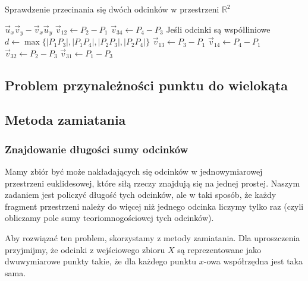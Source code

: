 \begin{algorithm}[H]
	\caption{Sprawdzenie przecinania się dwóch odcinków w przestrzeni $\mathbb{R}^2$}
	\begin{algorithmic}[1]
		\State \Return $\vec{u}_x \vec{v}_y - \vec{v}_x \vec{u}_y$
		\EndProcedure
		\State \Return \true
		\EndIf
		\State $\vec{v}_{12} \gets P_2 - P_1$
		\State $\vec{v}_{34} \gets P_4 - P_3$
		 \Comment Jeśli odcinki są współliniowe
		\State $d \gets \max\{|P_1P_3|, |P_1P_4|, |P_2P_3|, |P_2P_4|\}$
		\State \Return \true
		\EndIf
		\EndIf
		\State $\vec{v}_{13} \gets P_3 - P_1$
		\State $\vec{v}_{14} \gets P_4 - P_1$
		\State \Return \false
		\EndIf
		\State $\vec{v}_{32} \gets P_2 - P_3$
		\State $\vec{v}_{31} \gets P_1 - P_3$
		\State \Return \false
		\EndIf
		\State \Return \true
		\EndProcedure
	\end{algorithmic}
	\label{segment_intersection_r2}
\end{algorithm}


\subsection{Problem przynależności punktu do wielokąta}


\subsection{Metoda zamiatania}
\subsubsection{Znajdowanie długości sumy odcinków}
Mamy zbiór być może nakładających się odcinków w jednowymiarowej przestrzeni euklidesowej, które siłą rzeczy
znajdują się na jednej prostej. Naszym zadaniem jest policzyć długość tych odcinków, ale w taki sposób, że każdy
fragment przestrzeni należy do więcej niż jednego odcinka liczymy tylko raz (czyli obliczamy pole sumy
teoriomnogościowej tych odcinków).

Aby rozwiązać ten problem, skorzystamy z metody zamiatania. Dla
uproszczenia przyjmijmy, że odcinki z wejściowego zbioru $X$ są reprezentowane
jako dwuwymiarowe punkty takie, że dla każdego punktu $x$-owa
współrzędna jest taka sama.

